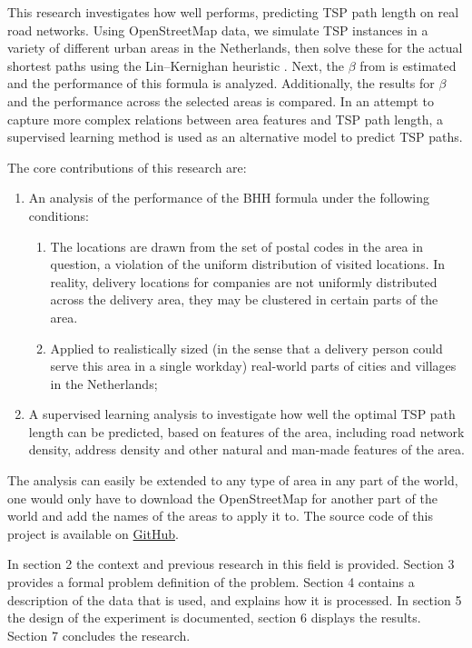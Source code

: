 This research investigates how well  performs, predicting TSP path length on real road networks.
Using OpenStreetMap \citep{openstreetmap} data, we simulate TSP instances in a variety of different urban areas in the Netherlands, then solve these for the actual shortest paths using the Lin–Kernighan heuristic \citep{lin1973effective}.
Next, the $\beta$ from  is estimated and the performance of this formula is analyzed.
Additionally, the results for $\beta$ and the performance across the selected areas is compared.
In an attempt to capture more complex relations between area features and TSP path length, a supervised learning method is used as an alternative model to predict TSP paths.

The core contributions of this research are:
\begin{enumerate}
	\item An analysis of the performance of the BHH formula under the following conditions:
	      \begin{enumerate}
		      \item The locations are drawn from the set of postal codes in the area in question, a violation of the uniform distribution of visited locations.
		            In reality, delivery locations for companies are not uniformly distributed across the delivery area, they may be clustered in certain parts of the area.
		      \item Applied to realistically sized (in the sense that a delivery person could serve this area in a single workday) real-world parts of
		            cities and villages in the Netherlands;
	      \end{enumerate}
	\item A supervised learning analysis to investigate how well the optimal TSP path length can be
	      predicted, based on features of the area, including road network density,
	      address density and other natural and man-made features of the area.
\end{enumerate}
The analysis can easily be extended to any type of area in any part of the world, one would only have to download the OpenStreetMap \citep{openstreetmap} for another part of the world and add the names of the areas to apply it to.
The source code of this project is available on \href{https://github.com/koen1859/BSc_Thesis}{GitHub}.

In section 2 the context and previous research in this field is provided.
Section 3 provides a formal problem definition of the problem.
Section 4 contains a description of the data that is used, and explains how it is processed.
In section 5 the design of the experiment is documented, section 6 displays the results.
Section 7 concludes the research.
